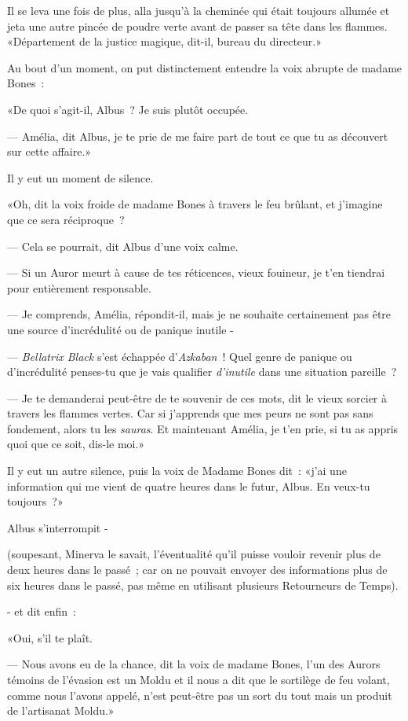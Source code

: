 Il se leva une fois de plus, alla jusqu'à la cheminée qui était toujours allumée et jeta une autre pincée de poudre verte avant de passer sa tête dans les flammes. «Département de la justice magique, dit-il, bureau du directeur.»

Au bout d'un moment, on put distinctement entendre la voix abrupte de madame Bones~:

«De quoi s'agit-il, Albus~? Je suis plutôt occupée.

--- Amélia, dit Albus, je te prie de me faire part de tout ce que tu as découvert sur cette affaire.»

Il y eut un moment de silence.

«Oh, dit la voix froide de madame Bones à travers le feu brûlant, et j'imagine que ce sera réciproque~?

--- Cela se pourrait, dit Albus d'une voix calme.

--- Si un Auror meurt à cause de tes réticences, vieux fouineur, je t'en tiendrai pour entièrement responsable.

--- Je comprends, Amélia, répondit-il, mais je ne souhaite certainement pas être une source d'incrédulité ou de panique inutile -

--- \emph{Bellatrix Black} s'est échappée d'\emph{Azkaban}~! Quel genre de panique ou d'incrédulité penses-tu que je vais qualifier \emph{d'inutile} dans une situation pareille~?

--- Je te demanderai peut-être de te souvenir de ces mots, dit le vieux sorcier à travers les flammes vertes. Car si j'apprends que mes peurs ne sont pas sans fondement, alors tu les \emph{sauras}. Et maintenant Amélia, je t'en prie, si tu as appris quoi que ce soit, dis-le moi.»

Il y eut un autre silence, puis la voix de Madame Bones dit~: «j'ai une information qui me vient de quatre heures dans le futur, Albus. En veux-tu toujours~?»

Albus s'interrompit -

(soupesant, Minerva le savait, l'éventualité qu'il puisse vouloir revenir plus de deux heures dans le passé~; car on ne pouvait envoyer des informations plus de six heures dans le passé, pas même en utilisant plusieurs Retourneurs de Temps).

- et dit enfin~:

«Oui, s'il te plaît.

--- Nous avons eu de la chance, dit la voix de madame Bones, l'un des Aurors témoins de l'évasion est un Moldu et il nous a dit que le sortilège de feu volant, comme nous l'avons appelé, n'est peut-être pas un sort du tout mais un produit de l'artisanat Moldu.»

